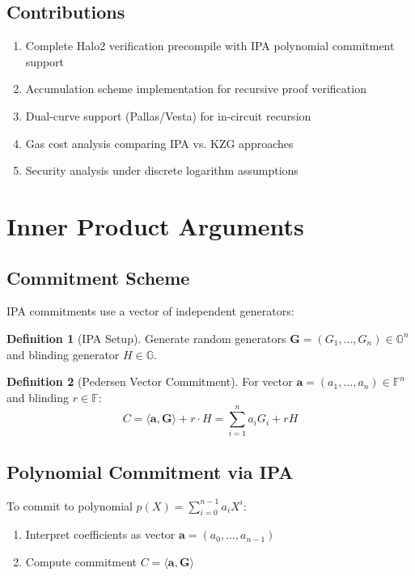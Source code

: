 \documentclass[11pt,a4paper]{article}
\theoremstyle{definition}
\newtheorem{definition}{Definition}
\begin{document}
\subsection{Contributions}

\begin{enumerate}
    \item Complete Halo2 verification precompile with IPA polynomial commitment support
    \item Accumulation scheme implementation for recursive proof verification
    \item Dual-curve support (Pallas/Vesta) for in-circuit recursion
    \item Gas cost analysis comparing IPA vs. KZG approaches
    \item Security analysis under discrete logarithm assumptions
\end{enumerate}

\section{Inner Product Arguments}

\subsection{Commitment Scheme}

IPA commitments use a vector of independent generators:

\begin{definition}[IPA Setup]
    Generate random generators $\mathbf{G} = (G_1, \ldots, G_n) \in \mathbb{G}^n$ and blinding generator $H \in \mathbb{G}$.
\end{definition}

\begin{definition}[Pedersen Vector Commitment]
    For vector $\mathbf{a} = (a_1, \ldots, a_n) \in \mathbb{F}^n$ and blinding $r \in \mathbb{F}$:
    \[
    C = \langle \mathbf{a}, \mathbf{G} \rangle + r \cdot H = \sum_{i=1}^{n} a_i G_i + r H
    \]
\end{definition}

\subsection{Polynomial Commitment via IPA}

To commit to polynomial $p(X) = \sum_{i=0}^{n-1} a_i X^i$:

\begin{enumerate}
    \item Interpret coefficients as vector $\mathbf{a} = (a_0, \ldots, a_{n-1})$
    \item Compute commitment $C = \langle \mathbf{a}, \mathbf{G} \rangle$
\end{enumerate}
\end{document}

